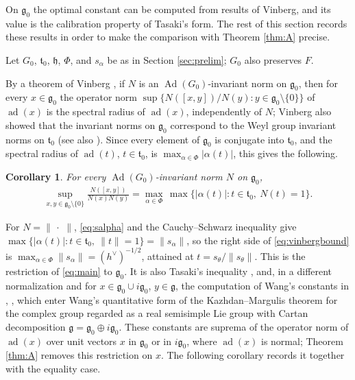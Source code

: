 \documentclass[leqno,10pt]{amsart}
\newtheorem{corollary}[theorem]{Corollary}%
\theoremstyle{definition}
\numberwithin{equation}{section}
\newcommand{\h}{\mathfrak{h}}
\newcommand{\dum}{\,\cdot\,\,}
\newcommand{\al}{\alpha}
\newcommand{\g}{\mathfrak{g}}
\newcommand{\ad}{\operatorname{ad}}
\newcommand{\Ad}{\operatorname{Ad}}
\newcommand{\gz}{\g_{0}}
\newcommand{\hv}{h^\vee}
\newcommand{\norm}[1]{\lVert #1\rVert}
\begin{document}
On $\gz$ the optimal constant can be computed from results of Vinberg, and its value is the calibration property of Tasaki's form. The rest of this section records these results in order to make the comparison with Theorem \ref{thm:A} precise.

Let $G_{0}$, $\mathfrak{t}_{0}$, $\h$, $\Phi$, and $s_{\al}$ be as in Section \ref{sec:prelim}; $G_{0}$ also preserves $F$.

By a theorem of Vinberg \cite[Theorem~2]{Vinberg-invariantnorms}, if $N$ is an $\Ad(G_{0})$-invariant norm on $\gz$, then for every $x \in \gz$ the operator norm $\sup\{N([x, y])/N(y): y \in \gz \setminus \{0\}\}$ of $\ad(x)$ is the spectral radius of $\ad(x)$, independently of $N$; Vinberg also showed that the invariant norms on $\gz$ correspond to the Weyl group invariant norms on $\mathfrak{t}_{0}$ \cite[Theorem~1]{Vinberg-invariantnorms} (see also \cite{Berestovksii-Nikonorov}). Since every element of $\gz$ is conjugate into $\mathfrak{t}_{0}$, and the spectral radius of $\ad(t)$, $t \in \mathfrak{t}_{0}$, is $\max_{\al \in \Phi}|\al(t)|$, this gives the following.
\begin{corollary}\label{cor:vinberg}
For every $\Ad(G_{0})$-invariant norm $N$ on $\gz$,
\begin{align}\label{eq:vinbergbound}
\sup_{x, y \in \gz\setminus\{0\}}\frac{N([x, y])}{N(x)N(y)} = \max_{\al \in \Phi}\,\max\big\{|\al(t)|: t \in \mathfrak{t}_{0},\ N(t) = 1\big\}.
\end{align}
\end{corollary}
For $N = \norm{\dum}$, \eqref{eq:salpha} and the Cauchy--Schwarz inequality give $\max\{|\al(t)| : t \in \mathfrak{t}_{0},\ \norm{t} = 1\} = \norm{s_{\al}}$, so the right side of \eqref{eq:vinbergbound} is $\max_{\al \in \Phi}\norm{s_{\al}} = (\hv)^{-1/2}$, attained at $t = s_{\theta}/\norm{s_{\theta}}$. This is the restriction of \eqref{eq:main} to $\gz$. It is also Tasaki's inequality \cite[(8) in the proof of Theorem~5]{Tasaki-calibration}, and, in a different normalization and for $x \in \gz \cup i\gz$, $y \in \g$, the computation of Wang's constants in \cite{Wang-nilpotent}, \cite[Proposition 4.1]{Adeboye-Wang-Wei}, which enter Wang's quantitative form of the Kazhdan--Margulis theorem for the complex group regarded as a real semisimple Lie group with Cartan decomposition $\g = \gz \oplus i\gz$. These constants are suprema of the operator norm of $\ad(x)$ over unit vectors $x$ in $\gz$ or in $i\gz$, where $\ad(x)$ is normal; Theorem \ref{thm:A} removes this restriction on $x$. The following corollary records it together with the equality case.
\end{document}
